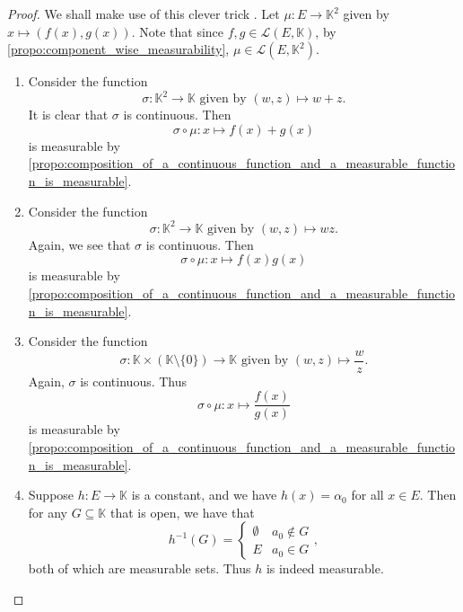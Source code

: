 \documentclass[notoc,notitlepage]{tufte-book}
\begin{document}
\begin{proof}
  We shall make use of this clever trick . Let $\mu : E \to \mathbb{K}^2$ given by $x \mapsto (f(x),
  g(x))$. Note that since $f, g \in \mathcal{L}(E, \mathbb{K})$, by
  \cref{propo:component_wise_measurability}, $\mu \in \mathcal{L}(E,
  \mathbb{K}^2)$.

  \begin{enumerate}
    \item Consider the function
      \begin{equation*}
        \sigma : \mathbb{K}^2 \to \mathbb{K} \text{ given by } (w, z) \mapsto w
        + z.
      \end{equation*}
      It is clear that $\sigma$ is continuous. Then
      \begin{equation*}
        \sigma \circ \mu : x \mapsto f(x) + g(x)
      \end{equation*}
      is measurable by
      \cref{propo:composition_of_a_continuous_function_and_a_measurable_function_is_measurable}.

    \item Consider the function
      \begin{equation*}
        \sigma : \mathbb{K}^2 \to \mathbb{K} \text{ given by } (w, z) \mapsto
        wz.
      \end{equation*}
      Again, we see that $\sigma$ is continuous. Then
      \begin{equation*}
        \sigma \circ \mu : x \mapsto f(x)g(x)
      \end{equation*}
      is measurable by
      \cref{propo:composition_of_a_continuous_function_and_a_measurable_function_is_measurable}.

    \item Consider the function
      \begin{equation*}
        \sigma : \mathbb{K} \times (\mathbb{K} \setminus \{0\}) \to \mathbb{K}
        \text{ given by } (w, z) \mapsto \frac{w}{z}.
      \end{equation*}
      Again, $\sigma$ is continuous. Thus
      \begin{equation*}
        \sigma \circ \mu : x \mapsto \frac{f(x)}{g(x)}
      \end{equation*}
      is measurable by
      \cref{propo:composition_of_a_continuous_function_and_a_measurable_function_is_measurable}.

    \item Suppose $h : E \to \mathbb{K}$ is a constant, and we have $h(x) = \alpha_0$ 
      for all $x \in E$. Then for any $G \subseteq \mathbb{K}$ that is open, we
      have that
      \begin{equation*}
        h^{-1}(G) = \begin{cases}
          \emptyset & a_0 \notin G \\
          E & a_0 \in G
        \end{cases},
      \end{equation*}
      both of which are measurable sets. Thus $h$ is indeed measurable.
  \end{enumerate}
\end{proof}
\end{document}
